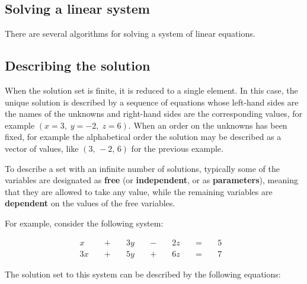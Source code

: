 \subsection{Solving a linear system}
\label{sss:solv-a1db}




There are several algorithms for solving a system of linear equations.




\subsection{Describing the solution}
\label{sss:desc-8ccf}




When the solution set is finite, it is reduced to a single element. In this case, the
unique solution is described by a sequence of equations whose left-hand sides are the
names of the unknowns and right-hand sides are the corresponding values, for example
$(x=3, \;y=-2,\; z=6)$. When an order on the unknowns has been fixed, for example the
alphabetical order the solution may be described as a vector of values, like $(3, \,-2,\,
6)$ for the previous example.



To describe a set with an infinite number of solutions, typically some of the variables
are designated as \textbf{free} (or \textbf{independent}, or as \textbf{parameters}),
meaning that they are allowed to take any value, while the remaining variables are
\textbf{dependent} on the values of the free variables.



For example, consider the following system:



\begin{align} x &&\; + \;&& 3y &&\; - \;&& 2z &&\; = \;&& 5 & \\ 3x &&\; + \;&& 5y &&\; + \;&& 6z &&\; = \;&& 7 & \end{align}

The solution set to this system can be described by the following equations:



